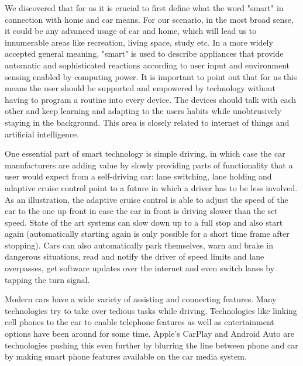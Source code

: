 We discovered that for us it is crucial to first define what the word "smart" in connection with home and car means. For our scenario, in the most broad sense, it could be any advanced usage of car and home, which will lead us to innumerable areas like recreation, living space, study etc. In a more widely accepted general meaning, "smart" is used to describe appliances that provide automatic and sophisticated reactions according to user input and environment sensing enabled by computing power. It is important to point out that for us this means the user should be supported and empowered by technology without having to program a routine into every device. The devices should talk with each other and keep learning and adapting to the users habits while unobtrusively staying in the background. This area is closely related to internet of things and artificial intelligence.


One essential part of smart technology is simple driving, in which case the car manufacturers are adding value by slowly providing parts of functionality that a user would expect from a self-driving car: lane switching, lane holding and adaptive cruise control point to a future in which a driver has to be less involved. As an illustration, the adaptive cruise control is able to adjust the speed of the car to the one up front in case the car in front is driving slower than the set speed. State of the art systems can slow down up to a full stop and also start again (automatically starting again is only possible for a short time frame after stopping). Cars can also automatically park themselves, warn and brake in dangerous situations, read and notify the driver of speed limits and lane overpasses, get software updates over the internet and even switch lanes by tapping the turn signal.~\cite{TeslaAutopilot}

Modern cars have a wide variety of assisting and connecting features. Many technologies try to take over tedious tasks while driving.  Technologies like linking cell phones to the car to enable telephone features as well as entertainment options have been around for some time. Apple's CarPlay and Android Auto are technologies pushing this even further by blurring the line between phone and car by making smart phone features available on the car media system.

